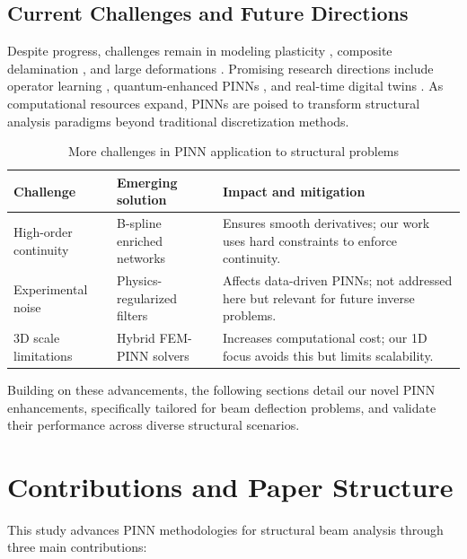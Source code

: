 \documentclass[twocolumn]{svjour3}
\begin{document}
	\subsection{Current Challenges and Future Directions}
	Despite progress, challenges remain in modeling plasticity \citep{Mozaffar2022}, composite delamination \citep{Bessa2023}, and large deformations \citep{Viana2024}. Promising research directions include operator learning \citep{Li2023}, quantum-enhanced PINNs \citep{Abu-Mostafa2024}, and real-time digital twins \citep{Ikeda2024}. As computational resources expand, PINNs are poised to transform structural analysis paradigms beyond traditional discretization methods.

	\begin{table}[htbp]
	  \centering
	  \caption{More challenges in PINN application to structural problems}\label{tab01}
	  \small
	  \setlength{\extrarowheight}{2pt}
	  \begin{tabularx}{\textwidth}{@{} l l Y @{}}
	    \toprule
	    \textbf{Challenge} & \textbf{Emerging solution} & \textbf{Impact and mitigation} \\
	    \midrule
	    High-order continuity
	      & B-spline enriched networks \citep{Shen2024}
	      & Ensures smooth derivatives; our work uses hard constraints to enforce continuity. \\
	    Experimental noise
	      & Physics-regularized filters \citep{Pati2023}
	      & Affects data-driven PINNs; not addressed here but relevant for future inverse problems. \\
	    3D scale limitations
	      & Hybrid FEM-PINN solvers \citep{Zhang2024}
	      & Increases computational cost; our 1D focus avoids this but limits scalability. \\
	    \bottomrule
	  \end{tabularx}
	\end{table}

	Building on these advancements, the following sections detail our novel PINN enhancements, specifically tailored for beam deflection problems, and validate their performance across diverse structural scenarios.

\section{Contributions and Paper Structure}
This study advances PINN methodologies for structural beam analysis through three main contributions:
\end{document}
